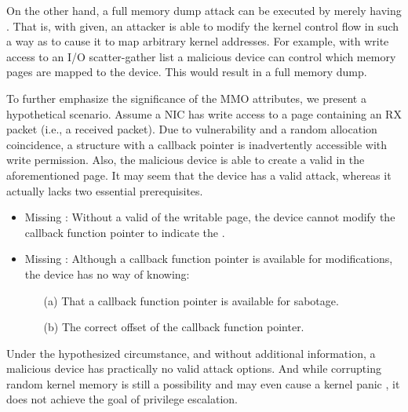 On the other hand, a full memory dump attack can be executed by merely having \oportunity.
That is, with \oportunity given, an attacker is able to modify the kernel control flow in such a way as to cause it to map arbitrary kernel addresses. For example, with write access to an I/O scatter-gather list a malicious device can control which memory pages are mapped to the device. This would result in a full memory dump.

To further emphasize the significance of the MMO attributes, we present a hypothetical scenario. Assume a NIC has write access to a page containing an RX packet (i.e., a received packet). Due to \subpage{} vulnerability and a random allocation coincidence, a structure with a callback pointer is inadvertently accessible with write permission. Also, the malicious device is able to create a valid \mabaf{} in the aforementioned page. It may seem that the device has a valid attack, whereas it actually lacks two essential prerequisites.

\begin{itemize}
    \item Missing \means: Without a valid \kva{} of the writable page, the device cannot modify the callback function pointer to indicate the \mabaf.
    \item Missing \oportunity: Although a callback function pointer is available for modifications, the device has no way of knowing: 
    \begin{enumerate}
        \item[(a)] That a callback function pointer is available for sabotage.
        \item[(b)] The correct offset of the callback function pointer.
    \end{enumerate}
\end{itemize}

Under the hypothesized circumstance, and without additional information, a malicious device has practically no valid attack options. 
And while corrupting random kernel memory is still a possibility and may even cause a kernel panic \cite{MMT16}, it does not achieve the goal of privilege escalation.


